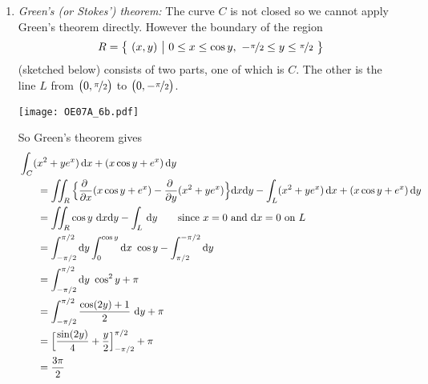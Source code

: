 \begin{solution}
\begin{enumerate}[(1)]
\item \emph{Green's (or Stokes') theorem:}
The curve $C$ is not closed so we cannot apply Green's theorem directly.
However the boundary of the region
\begin{equation*}
R = \Set{(x,y)}{ 0\le x\le\cos y,\ 
           -\nicefrac{\pi}{2}\le y\le \nicefrac{\pi}{2} }
\end{equation*}
(sketched below) consists of two parts, one of which is $C$. The other 
is the line $L$ from $\big(0,\nicefrac{\pi}{2}\big)$ 
to $\big(0,-\nicefrac{\pi}{2}\big)$.

     \begin{center}
          \texttt{[image: OE07A\_6b.pdf]}
     \end{center}

So Green's theorem gives
\begin{align*}
&\int_C (x^2 + y e^x ) \,\dee{x} + (x \cos y + e^x ) \,\dee{y} \\
&\hskip0.25in=\dblInt_R \Big\{\pdiff{}{x}(x \cos y + e^x )
          -\pdiff{}{y}(x^2 + y e^x )\Big\}\dee{x}\dee{y}
-\int_L (x^2 + y e^x ) \,\dee{x} + (x \cos y + e^x ) \,\dee{y} \\
&\hskip0.25in=\dblInt_R \cos y\ \dee{x}\dee{y}  -  \int_L \,\dee{y}\qquad
    \text{since $x=0$ and $\dee{x}=0$ on $L$} \\
&\hskip0.25in=\int_{-\pi/2}^{\pi/2}\dee{y}\int_0^{\cos y}\dee{x}\ \cos y
                       -\int_{\pi/2}^{-\pi/2}\dee{y} \\
&\hskip0.25in=\int_{-\pi/2}^{\pi/2}\dee{y}\ \cos^2 y
                       + \pi \\
&\hskip0.25in
  =\int_{-\pi/2}^{\pi/2} \frac{\cos(2y)+1}{2}\ \dee{y} + \pi \\
&\hskip0.25in
  =\Big[ \frac{\sin(2y)}{4} +\frac{y}{2}\Big]_{-\pi/2}^{\pi/2} +\pi \\
&\hskip0.25in
  =\frac{3\pi}{2}
\end{align*}



\end{enumerate}
\end{solution}
